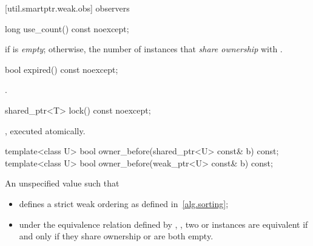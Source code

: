 [util.smartptr.weak.obs]{ observers}
%
\begin{itemdecl}
long use_count() const noexcept;
\end{itemdecl}

\begin{itemdescr}
\pnum\returns  {} if  is \textit{empty};
otherwise, the number of  instances
that \textit{share ownership} with .
\end{itemdescr}

%
\begin{itemdecl}
bool expired() const noexcept;
\end{itemdecl}

\begin{itemdescr}
\pnum\returns  {}.
\end{itemdescr}

%
\begin{itemdecl}
shared_ptr<T> lock() const noexcept;
\end{itemdecl}

\begin{itemdescr}
\pnum\returns  {}, executed atomically.
\end{itemdescr}

%
\begin{itemdecl}
template<class U> bool owner_before(shared_ptr<U> const& b) const;
template<class U> bool owner_before(weak_ptr<U> const& b) const;
\end{itemdecl}

\begin{itemdescr}
\pnum
\returns An unspecified value such that

\begin{itemize}
\item {} defines a strict weak ordering as defined in~\ref{alg.sorting};

\item under the equivalence relation defined by ,
, two  or
 instances are equivalent if and only if they share ownership or are
both empty.
\end{itemize}
\end{itemdescr}


